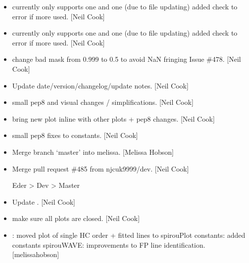 \documentclass[a4paper,10pt,english]{report}
\begin{document}
\begin{itemize}
\item {} 
 \sphinxhyphen{} currently only supports one  and one
 (due to file updating) \sphinxhyphen{} added check to error if more used.
{[}Neil Cook{]}

\item {} 
 \sphinxhyphen{} currently only supports one  and one
 (due to file updating) \sphinxhyphen{} added check to error if more used.
{[}Neil Cook{]}

\item {} 
 \sphinxhyphen{} change bad mask from 0.999 to 0.5 to avoid NaN
fringing \sphinxhyphen{} Issue \#478. {[}Neil Cook{]}

\item {} 
Update date/version/changelog/update notes. {[}Neil Cook{]}

\item {} 
 \sphinxhyphen{} small pep8 and visual changes / simplifications. {[}Neil
Cook{]}

\item {} 
 \sphinxhyphen{} bring new plot in\sphinxhyphen{}line with other plots + pep8
changes. {[}Neil Cook{]}

\item {} 
 \sphinxhyphen{} small pep8 fixes to constants. {[}Neil Cook{]}

\item {} 
Merge branch ‘master’ into melissa. {[}Melissa Hobson{]}

\item {} 
Merge pull request \#485 from njcuk9999/dev. {[}Neil Cook{]}

Eder \textendash{}\textgreater{} Dev \textendash{}\textgreater{} Master

\item {} 
Update . {[}Neil Cook{]}

\item {} 
 \sphinxhyphen{} make sure all plots are closed. {[}Neil Cook{]}

\item {} 
: moved plot of single HC order + fitted lines to
spirouPlot constants: added  constants spirouWAVE:
improvements to FP line identification. {[}melissa\sphinxhyphen{}hobson{]}


\end{itemize}
\end{document}
